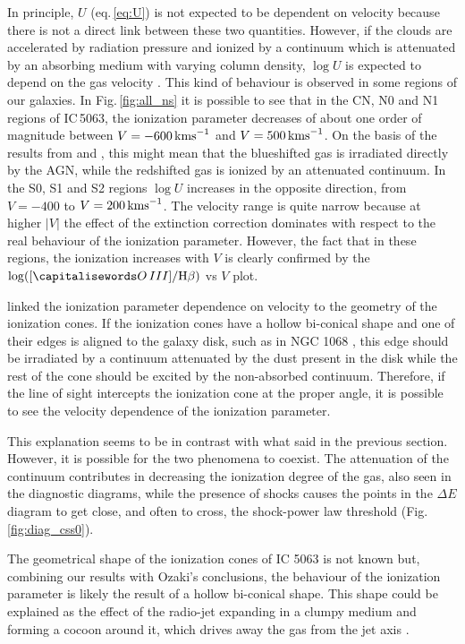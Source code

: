 \documentclass[../thesis.tex]{subfiles}
\begin{document}
In principle, $U$ (eq.\,\ref{eq:U}) is not expected to be dependent on velocity because there is not a direct link between these two quantities.
However, if the clouds are accelerated by radiation pressure and ionized by a continuum which is attenuated by an absorbing medium with varying column density, $\log U$ is expected to depend on the gas velocity \citep{Ozaki09}.
This kind of behaviour is observed in some regions of our galaxies.
In Fig.\,\ref{fig:all_ns} it is possible to see that in the CN, N0 and N1 regions of IC\,5063, the ionization parameter decreases of about one order of magnitude between $V=-600\,\si{\kms}$ and $V=500\,\si{\kms}$.
On the basis of the results from \citet{Kraemer00} and \citet{Ozaki09}, this might mean that the blueshifted gas is irradiated directly by the AGN, while the redshifted gas is ionized by an attenuated continuum.
In the S0, S1 and S2 regions $\log U$ increases in the opposite direction, from $V=-400$ to $V=200\,\si{\kms}$.
The velocity range is quite narrow because at higher $\lvert V \rvert$ the effect of the extinction correction dominates with respect to the real behaviour of the ionization parameter.
However, the fact that in these regions, the ionization increases with $V$ is clearly confirmed by the $\log([\ion{O}{III}]/\Hb)$ vs $V$ plot.

\citet{Ozaki09} linked  the ionization parameter dependence on velocity to the geometry of the ionization cones.
If the ionization cones have a hollow bi-conical shape and one of their edges is aligned to the galaxy disk, such as in NGC 1068 \citep{Cecil02, Das06}, this edge should be irradiated by a continuum attenuated by the dust present in the disk while the rest of the cone should be excited by the non-absorbed continuum.
Therefore, if the line of sight intercepts the ionization cone at the proper angle, it is possible to see the velocity dependence of the ionization parameter.

This explanation seems to be in contrast with what said in the previous section.
However, it is possible for the two phenomena to coexist. 
The attenuation of the continuum contributes in decreasing the ionization degree of the gas, also seen in the diagnostic diagrams, while the presence of shocks causes the points in the $\Delta E$ diagram to get close, and often to cross, the shock-power law threshold (Fig.\,\ref{fig:diag_css0}).

The geometrical shape of the ionization cones of IC 5063 is not known but, combining our results with Ozaki's conclusions, the behaviour of the ionization parameter is likely the result of a hollow bi-conical shape. 
This shape could be explained as the effect of the radio-jet expanding in a clumpy medium and forming a cocoon around it, which drives away the gas from the jet axis \citep{Morganti15,Dasyra15} . 
\end{document}
